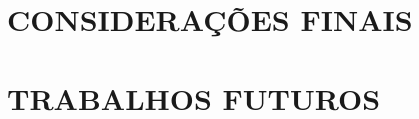 
\chapter{CONSIDERAÇÕES FINAIS}
\label{chap:conclusao}

\lipsum[13-15]

\chapter{TRABALHOS FUTUROS}
\label{sec:trabalhosFuturos}

\lipsum[13-15]